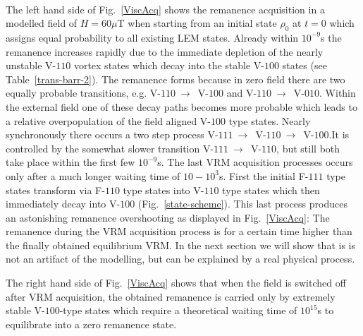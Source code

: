 ~\\[0.2cm]%
The left hand side of Fig.~\ref{ViscAcq} shows the remanence acquisition in a modelled
field of $H=60\mu$T when starting from an initial state $\rho_0$ at $t=0$ which assigns equal probability
to all existing LEM states.
Already within $10^{-9}$s the remanence increases rapidly due to the immediate
depletion of the nearly unstable V-$110$ vortex states which decay into the
  stable
V-$100$ states (see Table~\ref{trans-barr-2}).
The remanence forms because in zero field there are two equally probable
transitions, e.g. V-$110~\rightarrow$~V-$100$ and V-$110~\rightarrow$~V-$010$.
Within the external field one of these decay paths becomes more probable which leads to
a relative overpopulation of the field aligned V-$100$ type states.
Nearly synchronously there occurs a two step process
V-$111~\rightarrow$~V-$110~\rightarrow$~V-$100$.It
is controlled by the somewhat slower transition V-$111~\rightarrow$~V-$110$, but still
both take place within the first few $10^{-9}$s.
The last VRM acquisition processes occurs only after a much longer waiting time of $10-10^3$s.
First the initial F-$111$ type states transform via F-$110$ type states into V-$110$ type states
which then immediately decay into V-$100$
(Fig.~\ref{state-scheme}).
This last process  produces an astonishing remanence overshooting as displayed in
Fig.~\ref{ViscAcq}: The remanence during the VRM acquisition process is for a certain time
higher than the finally obtained equilibrium VRM.
In the next section we will show that is is not an artifact of the modelling,
but can be explained by a  real physical process.

The right hand side of  Fig.~\ref{ViscAcq} shows that
when the field is switched off after VRM acquisition, the obtained remanence is carried
only by   extremely stable  V-$100$-type states which require a   theoretical
waiting time of $10^{15}$s to equilibrate into a zero remanence state. 